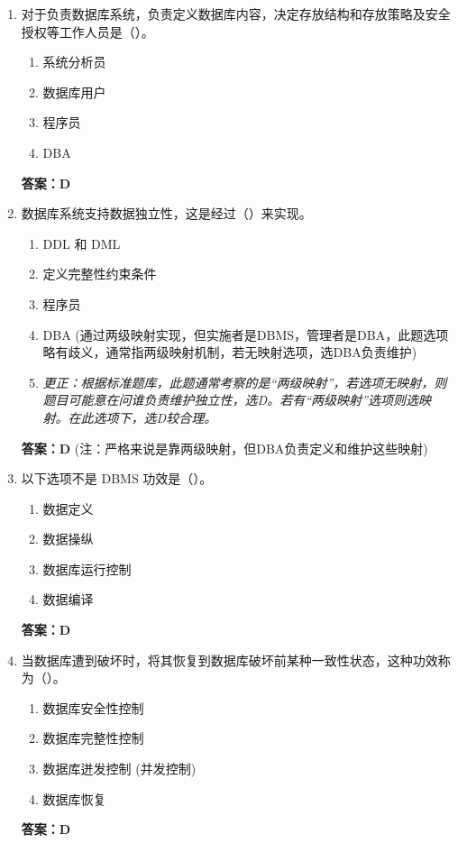 \documentclass[12pt, a4paper]{article}
\begin{document}
\begin{enumerate}[label=\arabic*.]
    \item 对于负责数据库系统，负责定义数据库内容，决定存放结构和存放策略及安全授权等工作人员是（\quad）。
    \begin{enumerate}
        \item 系统分析员
        \item 数据库用户
        \item 程序员
        \item DBA
    \end{enumerate}
    \textbf{答案：D}

    \item 数据库系统支持数据独立性，这是经过（\quad）来实现。
    \begin{enumerate}
        \item DDL 和 DML
        \item 定义完整性约束条件
        \item 程序员
        \item DBA (通过两级映射实现，但实施者是DBMS，管理者是DBA，此题选项略有歧义，通常指两级映射机制，若无映射选项，选DBA负责维护)
        \item \textit{更正：根据标准题库，此题通常考察的是“两级映射”，若选项无映射，则题目可能意在问谁负责维护独立性，选D。若有“两级映射”选项则选映射。在此选项下，选D较合理。}
    \end{enumerate}
    \textbf{答案：D} (注：严格来说是靠两级映射，但DBA负责定义和维护这些映射)

    \item 以下选项不是 DBMS 功效是（\quad）。
    \begin{enumerate}
        \item 数据定义
        \item 数据操纵
        \item 数据库运行控制
        \item 数据编译
    \end{enumerate}
    \textbf{答案：D}

    \item 当数据库遭到破坏时，将其恢复到数据库破坏前某种一致性状态，这种功效称为（\quad）。
    \begin{enumerate}
        \item 数据库安全性控制
        \item 数据库完整性控制
        \item 数据库迸发控制 (并发控制)
        \item 数据库恢复
    \end{enumerate}
    \textbf{答案：D}


\end{enumerate}
\end{document}
